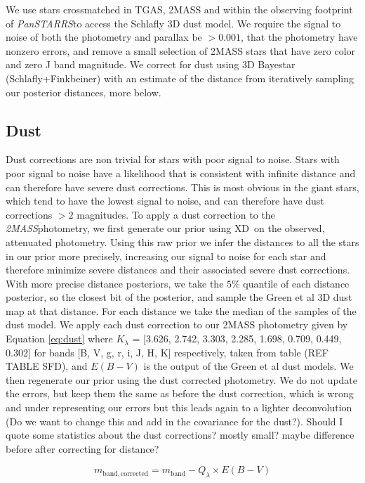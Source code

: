 \documentclass[modern]{aastex61}
\newcommand{\acronym}[1]{{\small{#1}}}
\newcommand{\project}[1]{\textsl{#1}}
\newcommand{\tmass}{\project{\acronym{2MASS}}}
\newcommand{\panstarrs}{\project{Pan\acronym{STARRS}}}
\newcommand{\xd}{\acronym{XD}}
\begin{document}
We use stars crossmatched in TGAS, 2MASS and within the observing footprint of \panstarrs to access the Schlafly 3D dust model. We require the signal to noise of both the photometry and parallax be $> 0.001$, that the photometry have nonzero errors, and remove a small selection of 2MASS stars that have zero color and zero J band magnitude. We correct for dust using 3D Bayestar (Schlafly+Finkbeiner) with an estimate of the distance from iteratively sampling our posterior distances, more below.

\subsection{Dust}

Dust corrections are non trivial for stars with poor signal to noise. Stars with poor signal to noise have a likelihood that is consistent with infinite distance and can therefore have severe dust corrections. This is most obvious in the giant stars, which tend to have the lowest signal to noise, and can therefore have dust corrections $> 2$ magnitudes. To apply a dust correction to the \tmass photometry, we first generate our prior using \xd\ on the observed, attenuated photometry. Using this raw prior we infer the distances to all the stars in our prior more precisely, increasing our signal to noise for each star and therefore minimize severe distances and their associated severe dust corrections. With more precise distance posteriors, we take the $5\%$ quantile of each distance posterior, so the closest bit of the posterior, and sample the Green et al 3D dust map at that distance. For each distance we take the median of the samples of the dust model. We apply each dust correction to our 2MASS photometry given by Equation \ref{eq:dust} where $K_{\lambda}$ = [3.626, 2.742, 3.303, 2.285, 1.698, 0.709, 0.449, 0.302] for bands [B, V, g, r, i, J, H, K] respectively, taken from table (REF TABLE SFD), and $E(B-V)$ is the output of the Green et al dust models. We then regenerate our prior using the dust corrected photometry. We do not update the errors, but keep them the same as before the dust correction, which is wrong and under representing our errors but this leads again to a lighter deconvolution (Do we want to change this and add in the covariance for the dust?). Should I quote some statistics about the dust corrections? mostly small? maybe difference before after correcting for distance?

\begin{equation}
m_{\mathrm{band, corrected}} = m_{\mathrm{band}} - Q_{\lambda} \times E(B-V)
\label{eq:dust}
\end{equation}
\end{document}
